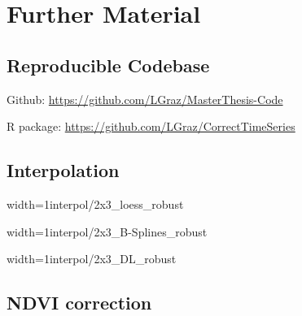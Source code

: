 \chapter{Further Material}
\section{Reproducible Codebase}

Github: \url{https://github.com/LGraz/MasterThesis-Code} 

R package: \url{https://github.com/LGraz/CorrectTimeSeries } 


\section{Interpolation}
\begin{my_figure}[h]{width=1\textwidth}{interpol/2x3_loess_robust}
	\caption{The LOESS smoother \RobItPlot}
	\label{fig:interpol/2x3_loess_robust}
\end{my_figure}

\begin{my_figure}[h]{width=1\textwidth}{interpol/2x3_B-Splines_robust}
	\caption{B-Splines \RobItPlot}
	\label{fig:interpol/2x3_B-Splines_robust}
\end{my_figure}

\begin{my_figure}[h]{width=1\textwidth}{interpol/2x3_DL_robust}
	\caption{A Double Logistic curve \RobItPlot}
	\label{fig:interpol/2x3_DL_robust}
\end{my_figure}




\section{NDVI correction}



